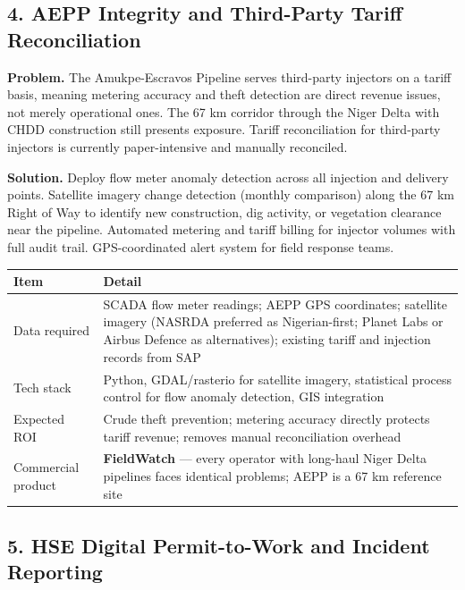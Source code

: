 \documentclass[10pt]{article}
\newcommand{\spacer}{\vspace{10pt}}
\newcommand{\bigspacer}{\vspace{16pt}}
\begin{document}
\bigspacer

\subsection*{4. AEPP Integrity and Third-Party Tariff Reconciliation}

\textbf{Problem.}
The Amukpe-Escravos Pipeline serves third-party injectors on a tariff basis,
meaning metering accuracy and theft detection are direct revenue issues, not
merely operational ones. The 67 km corridor through the Niger Delta with CHDD
construction still presents exposure. Tariff reconciliation for third-party
injectors is currently paper-intensive and manually reconciled.

\textbf{Solution.}
Deploy flow meter anomaly detection across all injection and delivery points.
Satellite imagery change detection (monthly comparison) along the 67 km Right
of Way to identify new construction, dig activity, or vegetation clearance
near the pipeline. Automated metering and tariff billing for injector volumes
with full audit trail. GPS-coordinated alert system for field response teams.

\spacer
\small
\begin{tabularx}{\columnwidth}{@{}lX@{}}
\toprule
\textbf{Item} & \textbf{Detail} \\
\midrule
Data required     & SCADA flow meter readings; AEPP GPS coordinates;
                    satellite imagery (NASRDA preferred as Nigerian-first;
                    Planet Labs or Airbus Defence as alternatives); existing
                    tariff and injection records from SAP \\
Tech stack        & Python, GDAL/rasterio for satellite imagery, statistical
                    process control for flow anomaly detection, GIS integration \\
Expected ROI      & Crude theft prevention; metering accuracy directly protects
                    tariff revenue; removes manual reconciliation overhead \\
Commercial product & \textbf{FieldWatch} --- every operator with long-haul Niger
                    Delta pipelines faces identical problems; AEPP is a 67 km
                    reference site \\
\bottomrule
\end{tabularx}
\normalsize

\bigspacer

\subsection*{5. HSE Digital Permit-to-Work and Incident Reporting}
\end{document}
